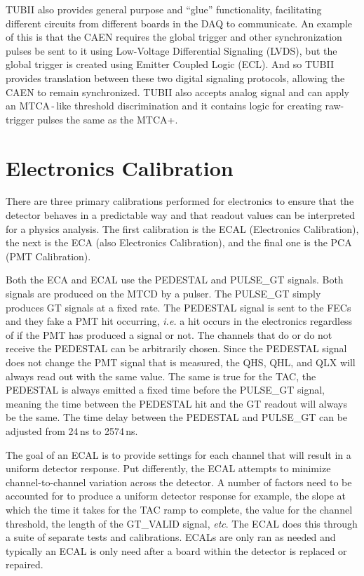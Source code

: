 TUBII also provides general purpose and ``glue'' functionality,
facilitating different circuits from different boards in the DAQ to communicate.
An example of this is that the CAEN requires the global trigger and
other synchronization pulses be sent to it using Low-Voltage Differential
Signaling (LVDS), but the global trigger is created using Emitter Coupled
Logic (ECL).
And so TUBII provides translation between these two digital signaling protocols,
allowing the CAEN to remain synchronized.
TUBII also accepts analog signal and can apply an MTCA\,-\,like threshold
discrimination and it contains logic for creating raw-trigger pulses the
same as the MTCA+.

\section{Electronics Calibration}
There are three primary calibrations performed for electronics to ensure that the
detector behaves in a predictable way and that readout values can be interpreted
for a physics analysis. The first calibration is the ECAL (Electronics Calibration),
the next is the ECA (also Electronics Calibration), and the final one is the PCA (PMT
Calibration).

Both the ECA and ECAL use the PEDESTAL and PULSE\_GT signals. Both signals
are produced on the MTCD by a pulser.
The PULSE\_GT simply produces GT signals at a fixed rate.
The PEDESTAL signal is sent to the FECs and they fake a PMT hit occurring,
\textit{i.e.} a hit occurs in the electronics regardless of if the PMT has
produced a signal or not.
The channels that do or do not receive the PEDESTAL can be arbitrarily chosen.
Since the PEDESTAL signal does not change the PMT signal that is measured, the
QHS, QHL, and QLX will always read out with the same value. The same is true
for the TAC, the PEDESTAL is always emitted a fixed time before the PULSE\_GT
signal, meaning the time between the PEDESTAL hit and the GT readout will always
be the same.
The time delay between the PEDESTAL and PULSE\_GT can be adjusted from
24\,ns to 2574\,ns.

The goal of an ECAL is to provide settings for each channel that will result in a uniform
detector response. Put differently, the ECAL attempts to minimize channel-to-channel variation
across the detector.
A number of factors need to be accounted for to produce a uniform detector response for example,
the slope at which the time it takes for the TAC ramp to complete, the value for the
channel threshold, the length of the GT\_VALID signal, \textit{etc}.
The ECAL does this through a suite of separate tests and calibrations.
ECALs are only ran as needed and typically an ECAL is only need after a board within the
detector is replaced or repaired.

